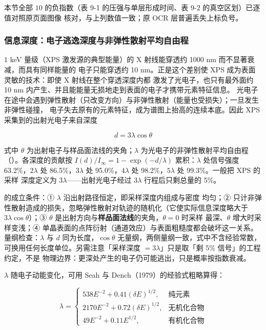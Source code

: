 本节全部 $10$ 的负指数（表 9-1 的压强与单层形成时间、表 9-2 的真空区划）已逐值对照原页面图像
核对，与上列数值一致；原 OCR 层普遍丢失上标负号。

\subsubsection{信息深度：电子逃逸深度与非弹性散射平均自由程}

$1$ keV 量级（XPS 激发源的典型能量）的 X 射线能穿透约 1000 nm 而不显著衰减，而具有同样能量的
电子只能穿透约 10 nm。正是这个差别使 XPS 成为表面灵敏的技术：即使 X 射线在整个穿透深度内都
激发了光电子，也只有最外面约 10 nm 内产生、并且能能量无损地走到表面的电子才携带元素特征信息。
光电子在途中会遇到弹性散射（只改变方向）与非弹性散射（能量也受损失）；一旦发生非弹性碰撞，
电子失去原有的元素特征，成为谱图上抬高的连续本底。因此 XPS 采集到的出射光电子来自深度

\begin{equation}\label{eq:sampling-depth}
d=3\lambda\cos\theta
\end{equation}

式中 $\theta$ 为出射电子与样品面法线的夹角；$\lambda$ 为光电子的非弹性散射平均自由程
（）。各深度的贡献按
$I(d)/I_{\infty}=1-\exp(-d/\lambda)$ 累积：$\lambda$ 处信号强度 63.2\%，$2\lambda$ 处
86.5\%，$3\lambda$ 处 95.0\%，$4\lambda$ 处 98.2\%，$5\lambda$ 处 99.3\%。一般把 XPS 的采样
深度定义为 $3\lambda$——出射光电子经过 $3\lambda$ 行程后只剩总量的 5\%。

\begin{keycond}
 的成立条件：① $\lambda$ 沿出射路径恒定，即采样深度内组成与密度
均匀；② 只计非弹性散射造成的损失，忽略弹性散射对轨迹的随机化（它使实际信息深度略大于
$3\lambda\cos\theta$）；③ $\theta$ 是出射方向与\textbf{样品面法线}的夹角，$\theta=0$ 时采样
最深、$\theta$ 增大时采样变浅；④ 单晶表面的点阵衍射（通道效应）与表面粗糙度都会破坏这一关系。
量纲检查：$\lambda$ 与 $d$ 同为长度，$\cos\theta$ 无量纲，两侧量纲一致，式中不含经验常数，
可换用任何长度单位。另需注意「采样深度 $=3\lambda$」只是取「剩 5\% 信号」的工程约定，不是
物理边界：更深处产生的电子仍可能逃出，只是概率按指数衰减。
\end{keycond}

$\lambda$ 随电子动能变化，可用 Seah 与 Dench（1979）的经验式粗略算得：

\begin{equation}\label{eq:imfp}
\lambda=
\begin{cases}
538E^{-2}+0.41(\delta E)^{1/2}, & \text{纯元素}\\
2170E^{-2}+0.72(\delta E)^{1/2}, & \text{无机化合物}\\
49E^{-2}+0.11E^{1/2}, & \text{有机化合物}
\end{cases}
\end{equation}

